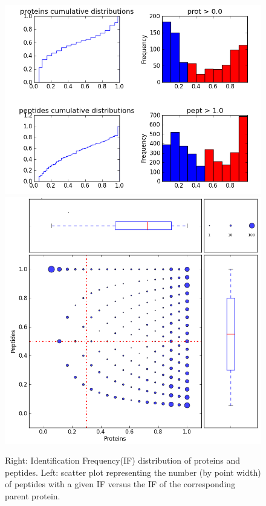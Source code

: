 \documentclass[a4paper,14pt]{extarticle}
\begin{document}
\begin{figure}[ht]
\begin{center}
\includegraphics[scale=0.4]{pie_hist.png}%
\includegraphics[scale=0.3]{scatter.png}
\caption{Right: Identification Frequency(IF) distribution of proteins and peptides. Left: scatter plot representing the number (by point width) of peptides with a given IF versus the IF of the corresponding parent protein.}\label{fig:graphics}
\end{center}
\end{figure}
\end{document}
